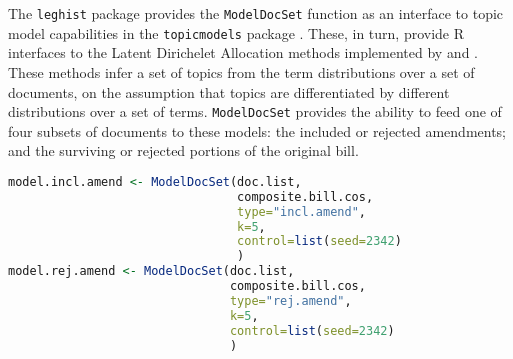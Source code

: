 \documentclass[11pt]{article}
\begin{document}
The \texttt{leghist} package provides the \texttt{ModelDocSet}
function as an interface to topic model capabilities in the
\texttt{topicmodels} package \citep{grun2011topicmodels}. These, in
turn, provide R interfaces to the Latent Dirichelet Allocation methods
implemented by \cite{blei2003latent} and
\cite{blei2006correlated}. These methods infer a set of topics from
the term distributions over a set of documents, on the assumption that
topics are differentiated by different distributions over a set of
terms. \texttt{ModelDocSet} provides the ability to feed one of four
subsets of documents to these models: the included or rejected
amendments; and the surviving or rejected portions of the original
bill. 

\begin{lstlisting}[language=R, numbers=none]
model.incl.amend <- ModelDocSet(doc.list,
                                composite.bill.cos,
                                type="incl.amend",
                                k=5,
                                control=list(seed=2342)
                                )
model.rej.amend <- ModelDocSet(doc.list,
                               composite.bill.cos,
                               type="rej.amend",
                               k=5,
                               control=list(seed=2342)
                               )
\end{lstlisting}





\end{document}
